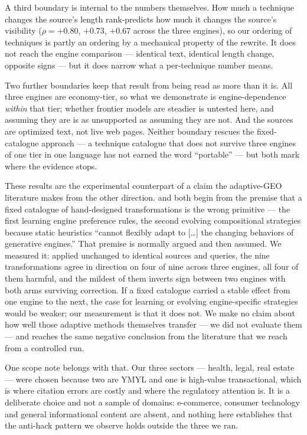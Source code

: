 \documentclass[11pt,a4paper]{article}
\begin{document}
A third boundary is internal to the numbers themselves. How much a
technique changes the source's length rank-predicts how much it changes the
source's visibility ($\rho = +0.80$, $+0.73$, $+0.67$ across the three
engines), so our ordering of techniques is partly an ordering by a
mechanical property of the rewrite. It does not reach the engine comparison
--- identical text, identical length change, opposite signs --- but it does
narrow what a per-technique number means.

Two further boundaries keep that result from being read as more than it is. All
three engines are economy-tier, so what we demonstrate is engine-dependence
\emph{within} that tier; whether frontier models are steadier is untested
here, and assuming they are is as unsupported as assuming they are not. And
the sources are optimized text, not live web pages. Neither boundary rescues
the fixed-catalogue approach --- a technique catalogue that does not survive
three engines of one tier in one language has not earned the word
``portable'' --- but both mark where the evidence stops.

These results are the experimental counterpart of a claim the adaptive-GEO
literature makes from the other direction. \citet{wu2026autogeo} and
\citet{yuan2026agenticgeo} both begin from the premise that a fixed
catalogue of hand-designed transformations is the wrong primitive --- the
first learning engine preference rules, the second evolving compositional
strategies because static heuristics ``cannot flexibly adapt to [\ldots] the
changing behaviors of generative engines.'' That premise is normally argued
and then assumed. We measured it: applied unchanged to identical sources and
queries, the nine transformations agree in direction on four of nine across
three engines, all four of them harmful, and the mildest of them inverts
sign between two engines with both arms surviving correction. If a fixed
catalogue carried a stable effect from one engine to the next, the case for
learning or evolving engine-specific strategies would be weaker; our
measurement is that it does not. We make no claim about how well those
adaptive methods themselves transfer --- we did not evaluate them --- and
\citet{martinez2026survey} reaches the same negative conclusion from the
literature that we reach from a controlled run.

One scope note belongs with that. Our three sectors --- health, legal, real
estate --- were chosen because two are YMYL and one is high-value
transactional, which is where citation errors are costly and where the
regulatory attention is. It is a deliberate choice and not a sample of
domains: e-commerce, consumer technology and general informational content
are absent, and nothing here establishes that the anti-hack pattern we
observe holds outside the three we ran.
\end{document}
